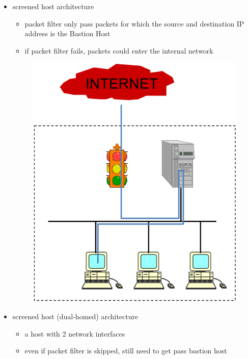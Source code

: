 \documentclass[twocolumn,landscape,10pt]{article}
\theoremstyle{definition}
\begin{document}
\begin{itemize}
    \item screened host architecture
        \begin{itemize}
            \item packet filter only pass packets for which the source and
                destination IP address is the Bastion Host
            \item if packet filter fails, packets could enter the internal
                network
        \end{itemize} 
        \begin{figure}[h]
          	\includegraphics[scale=0.25]{screened_host.png}
          	\centering
        \end{figure}
    \item screened host (dual-homed) architecture
        \begin{itemize}
            \item a host with 2 network interfaces
            \item even if packet filter is skipped, still need to get pass bastion host
        \end{itemize} 

\end{itemize}
\end{document}
